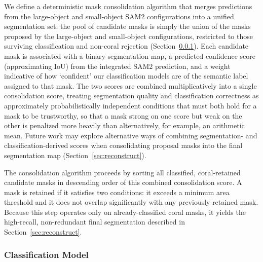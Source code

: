 \documentclass[11pt]{elsarticle}
\begin{document}
We define a deterministic mask consolidation algorithm that merges predictions from the large-object and small-object SAM2 configurations into a unified segmentation set: the pool of candidate masks is simply the union of the masks proposed by the large-object and small-object configurations, restricted to those surviving classification and non-coral rejection (Section~\ref{sec:cnn}). Each candidate mask is associated with a binary segmentation map, a predicted confidence score (approximating IoU) from the integrated SAM2 prediction, and a weight indicative of how `confident' our classification models are of the semantic label assigned to that mask. The two scores are combined multiplicatively into a single consolidation score, treating segmentation quality and classification correctness as approximately probabilistically independent conditions that must both hold for a mask to be trustworthy, so that a mask strong on one score but weak on the other is penalized more heavily than alternatively, for example, an arithmetic mean. Future work may explore alternative ways of combining segmentation- and classification-derived scores when consolidating proposal masks into the final segmentation map (Section~\ref{sec:reconstruct}).

The consolidation algorithm proceeds by sorting all classified, coral-retained candidate masks in descending order of this combined consolidation score. A mask is retained if it satisfies two conditions: it exceeds a minimum area threshold and it does not overlap significantly with any previously retained mask.
Because this step operates only on already-classified coral masks, it yields the high-recall, non-redundant final segmentation described in Section~\ref{sec:reconstruct}.

\subsubsection{Classification Model}
\label{sec:cnn}
\end{document}
